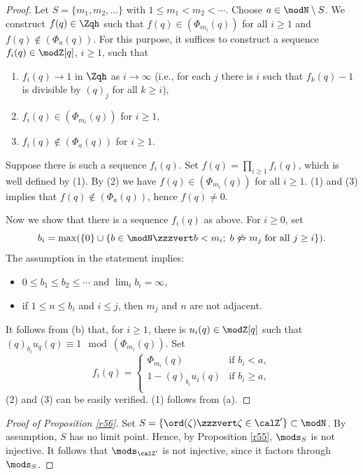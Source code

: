 \documentclass{amsart}
\numberwithin{equation}{section}
\numberwithin{figure}{section}
\theoremstyle{plain}
\theoremstyle{definition}
\theoremstyle{remark}
\begin{document}
\begin{proof}
  Let $S=\{m_1,m_2,\ldots \}$ with $1\le m_1<m_2<\cdots$.
  Choose $a\in \modN \setminus S$.  We
  construct $f(q)\in \Zqh$ such that $f(q)\in (\Phi _{m_i}(q))$ for all
  $i\ge 1$ and $f(q)\not\in (\Phi _a(q))$.
  For this purpose, it suffices to construct a sequence
  $f_i(q)\in \modZ [q]$, $i\ge 1$, such that
  \begin{enumerate}
  \item[(1)]
    $f_i(q)\rightarrow 1$ in $\Zqh$ as $i\rightarrow \infty $ (i.e., for each $j$ there is
    $i$ such that $f_k(q)-1$ is divisible by $(q)_j$ for all $k\ge i$),
  \item[(2)]
    $f_i(q)\in (\Phi _{m_i}(q))$ for $i\ge 1$,
  \item[(3)]
    $f_i(q)\not\in (\Phi _a(q))$ for $i\ge 1$.
  \end{enumerate}
  Suppose there is such a sequence $f_i(q)$.  Set
  $f(q)=\prod_{i\ge 1}f_i(q)$, which is well defined by (1).  By (2) we
  have $f(q)\in (\Phi _{m_i}(q))$ for all $i\ge 1$.  (1) and (3) implies that
  $f(q)\not\in (\Phi _a(q))$, hence $f(q)\neq0$.

  Now we show that there is a sequence $f_i(q)$ as above.
  For $i\ge 0$, set
  \begin{equation*}
    b_i=\max(\{0\}\cup \{b\in \modN \zzzvert b<m_i;\; b\not\Leftrightarrow m_j\;\text{for all $j\ge i$}\}).
  \end{equation*}
  The assumption in the statement implies:
  \begin{itemize}
  \item[(a)] $0\le b_1\le b_2\le \cdots$ and $\lim_{i}b_i=\infty $,
  \item[(b)] if $1\le n\le b_i$ and $i\le j$, then $m_j$ and $n$ are not adjacent.
  \end{itemize}
  It follows from (b) that, for $i\ge 1$, there is $u_i(q)\in \modZ [q]$ such
  that $(q)_{b_i}u_q(q)\equiv1\mod{(\Phi _{m_i}(q))}$.  Set
  \begin{equation*}
    f_i(q)=
    \begin{cases}
      \Phi _{m_i}(q)& \text{if $b_i<a$}, \\
      1-(q)_{b_i}u_i(q)& \text{if $b_i\ge a$},\\
    \end{cases}
  \end{equation*}
  (2) and (3) can be easily verified.  (1) follows from (a).
\end{proof}

\begin{proof}[Proof of Proposition \ref{r56}]
  Set $S=\{\ord(\zeta )\zzzvert \zeta \in \calZ'\}\subset \modN $.  By assumption, $S$ has no
  limit point.  Hence, by Proposition \ref{r55}, $\mods _S$ is not
  injective.  It follows that $\mods _{\calZ'}$ is not injective, since it
  factors through $\mods _S$.
\end{proof}
\end{document}
